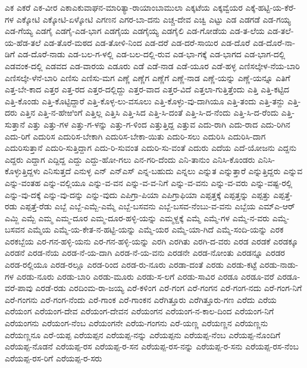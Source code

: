 ಎಕ
ಎಕರೆ
ಎಕ-ವೀರ
ಎಕಾಎಕುವಾಘನ-ಮಾರಿತ್ಯಾ-ರಾಯಾಂಬಾಮುಲಾ
ಎಕ್ಕಟೆಯ
ಎಕ್ಕವ್ವೆಯರ
ಎಕ್ಕೆ-ಹಟ್ಟಿ-ಯ-ಕೆರೆ-ಗಳ
ಎಕ್ಕೋಟಿ
ಎಕ್ಕೋಟಿ-ಏಳ್ಕೋಟಿ
ಎಗಣನ
ಎಗರ-ಬಾ-ದನು
ಎಚ್ಚ-ದೇವ
ಎಚ್ವಿ
ಎಟ್ಟು
ಎಡ
ಎಡಗಡೆ
ಎಡ-ಗಯ್ಯ
ಎಡ-ಗೆಯ್ಯ
ಎಡಗೈ
ಎಡಗೈ-ಎಡ-ಭಾಗ
ಎಡಗೈಯ
ಎಡಗೈಯ್ಯ
ಎಡಗೈಲಿ
ಎಡ-ಗೋಡೆಯ
ಎಡ-ತ-ಲೆಯ
ಎಡ-ತಲೆ-ಯ-ಹೆಡ-ತಲೆ
ಎಡ-ತೊರೆ-ಮಠದ
ಎಡ-ತೋಳಿ-ನಿಂದ
ಎಡ-ದರೆ
ಎಡ-ದರೆ-ಸಾಯಿರ
ಎಡ-ದೊರೆ
ಎಡ-ದೊರೆ-ನಾ-ಡಿಗೆ
ಎಡ-ದೊರೆ-ನಾಡು
ಎಡ-ಬಲ-ಗ-ಳಲ್ಲಿ
ಎಡ-ಬಲ-ದಲ್ಲಿ-ರುವ
ಎಡ-ಭಾ-ಗಕ್ಕೆ
ಎಡ-ಭಾಗದ
ಎಡ-ಭಾಗ-ದಲ್ಲಿ
ಎಡವಂಕ-ದಲ್ಲಿ
ಎಡವದ
ಎಡ-ವಾರಯ
ಎಡೂರು
ಎಡೆ
ಎಡೆ-ನಾಡ
ಎಡೆ-ಯೂರ
ಎಡೆ-ಹಳ್ಳ
ಎಣಿಸಲ್ಕೇಳ-ನೆಯ-ಬಾರಿ
ಎಣಿಸಲ್ಕೇ-ಳೆನೆ-ಬಾರಿ
ಎಣಿಸು
ಎಣಿಸು-ಮಗ
ಎಣ್ಣೆ
ಎಣ್ಣೆಗ
ಎಣ್ಣೆಗೆ
ಎಣ್ಣೆ-ನಾಡ
ಎಣ್ಣೆ-ಯನ್ನು
ಎಣ್ಣೆ-ಯನ್ನೂ
ಎತಿಗೆ
ಎತ್ತ-ಬೇ-ಕಾದ
ಎತ್ತರ
ಎತ್ತ-ರದ
ಎತ್ತರ-ದಲ್ಲಿದ್ದು
ಎತ್ತರ-ವಾದ
ಎತ್ತರ-ವಿದೆ
ಎತ್ತಲಾ-ಗುತ್ತಿತ್ತೆಂದು
ಎತ್ತಿ
ಎತ್ತಿ-ಕಟ್ಟಿದ
ಎತ್ತಿ-ಕೊಂಡು
ಎತ್ತಿ-ಕೊಟ್ಟಿದ್ದಾರೆ
ಎತ್ತಿ-ಕೊಳ್ಳ-ಲು-ವಸೂಲು
ಎತ್ತಿ-ಕೊಳ್ಳು-ವು-ದಾಗಿಯೂ
ಎತ್ತಿ-ತಂದು
ಎತ್ತಿ-ತನ್ದು
ಎತ್ತಿ-ದರು
ಎತ್ತಿನ
ಎತ್ತಿ-ನ-ಹೇಱಿಂಗೆ
ಎತ್ತಿಲ್ಲ
ಎತ್ತಿಸಿ
ಎತ್ತಿ-ಸಿದ
ಎತ್ತಿ-ಸಿ-ದಂತೆ
ಎತ್ತಿ-ಸಿ-ದ-ನೆಂದು
ಎತ್ತಿ-ಸಿ-ದ-ರೆಂದು
ಎತ್ತಿ-ಸುತ್ತಾನೆ
ಎತ್ತು
ಎತ್ತು-ಗಳ
ಎತ್ತು-ಗ-ಳನ್ನು
ಎತ್ತು-ಗ-ಳಿಂದ
ಎತ್ತುತ್ತಿದ್ದ
ಎತ್ತುವ
ಎದು-ರಾಗಿ
ಎದು-ರಾದ
ಎದು-ರಿಗಿನ
ಎದು-ರಿಗೆ
ಎದುರಿಸ
ಎದುರಿಸ-ಬೇಕಾಗಿ
ಎದುರಿಸ-ಬೇಕಾ-ಯಿತು
ಎದುರಿ-ಸಲು
ಎದುರಿಸಿ
ಎದುರಿಸಿ-ದಾಗ
ಎದುರಿಸುತ್ತಾನೆ
ಎದುರಿ-ಸುತ್ತಿದ್ದಾಗ
ಎದು-ರಿ-ಸುವಂತ
ಎದುರಿ-ಸು-ವಂತೆ
ಎದುರು
ಎದೆಯ
ಎದೆ-ಯೋಜನು
ಎದ್ದನು
ಎದ್ದರು
ಎದ್ದಾಗ
ಎದ್ದಿದ್ದ
ಎದ್ದು
ಎದ್ದು-ಹೋ-ಗಲು
ಎನ-ಗರಿ-ದೆಂದು
ಎನಿ-ತಾನುಂ
ಎನಿಸಿ-ಕೊಂಡರು
ಎನಿಸಿ-ಕೊಳ್ಳುತ್ತಿದ್ದಳು
ಎನಿಸುತ್ತದೆ
ಎನುಳ್ಳ
ಎನ್
ಎನ್ಎಸ್
ಎನ್ನ-ಬಹುದು
ಎನ್ನಲು
ಎನ್ನುತ
ಎನ್ನುತ್ತಾರೆ
ಎನ್ನುತ್ತಿದ್ದರು
ಎನ್ನುವ
ಎನ್ನು-ವಂತಹ
ಎನ್ನು-ವಲ್ಲಿಯೂ
ಎನ್ನು-ವ-ವನ
ಎನ್ನು-ವ-ವ-ನಿಗೆ
ಎನ್ನು-ವ-ವನು
ಎನ್ನು-ವ-ವರು
ಎನ್ನು-ವಷ್ಟ-ರಲ್ಲಿ
ಎನ್ನು-ವು-ದಕ್ಕೆ
ಎನ್ನು-ವು-ದನ್ನು
ಎನ್ನು-ವುದು
ಎಪಿಗ್ರಾ-ಪಿಯಾ
ಎಪಿಗ್ರಾಫಿಯಾ
ಎಪ್ಪತ್ತಕ್ಕೆ
ಎಪ್ಪತ್ತನ್ನು
ಎಪ್ಪತ್ತು
ಎಪ್ಪತ್ತೆ-ರಡು
ಎಪ್ಪತ್ತೆ-ರೆಡು
ಎಬ್ಬೆ
ಎಬ್ಬೆ-ಎಮ್ಬೆ-ಎಮ್ಮೆ
ಎಬ್ಬೆ-ಬಸವನು
ಎಬ್ಬೆ-ಬಸವ-ನೆಂಬು-ವ-ವನು
ಎಬ್ಬೆಯ
ಎಮ್ಎ-ಆರ್
ಎಮ್ಜಿ
ಎಮ್ಬೆ
ಎಮ್ಮ
ಎಮ್ಮ-ದೂರ
ಎಮ್ಮ-ದೂರ-ಹಳ್ಳಿ-ಯನ್ನು
ಎಮ್ಮಳ್ದಕ್ಕೆ
ಎಮ್ಮೆ
ಎಮ್ಮೆ-ಗಳ
ಎಮ್ಮೆ-ನ-ವರು
ಎಮ್ಮೆ-ಬಸವನ
ಎಮ್ಮೆಯ
ಎಮ್ಮೆ-ಯ-ಕೇತ-ನ-ಹಟ್ಟಿ-ಯನ್ನು
ಎಮ್ಮೆ-ಯರ
ಎಮ್ಮೆ-ಯಾ-ಗಿದೆ
ಎಮ್ಮೆ-ಸಂದಿ-ಯನ್ನು
ಎರಕ
ಎರಕಬ್ಬೆಯ
ಎರ-ಗನ-ಹಳ್ಳಿ-ಯನು
ಎರ-ಗನ-ಹಳ್ಳಿ-ಯನ್ನು
ಎರಗಿ
ಎರಗಿತು
ಎರಗಿ-ದ-ವರು
ಎರಡ
ಎರಡಕೆ
ಎರಡಕ್ಕೂ
ಎರಡನೆ
ಎರಡ-ನೆಯ
ಎರಡ-ನೆ-ಯ-ದಾಗಿ
ಎರಡ-ನೆ-ಯ-ವನು
ಎರಡನೇ
ಎರಡ-ನೋಂತು
ಎರಡನ್ನೂ
ಎರಡರ
ಎರಡ-ರಲ್ಲಿಯೂ
ಎರಡ-ರಲ್ಲೂ
ಎರಡ-ರಿಂದ
ಎರಡ-ರು-ನೂರು
ಎರಡಾ-ದಂತೆ
ಎರಡು
ಎರಡು-ಕಟ್ಟೆ
ಎರಡು-ನಾಡು-ಗಳ
ಎರಡು-ನೂರು
ಎರಡು-ಬಾರಿ
ಎರಡು-ಮೂರು
ಎರಡು-ಸ-ಲಗೆ
ಎರಡು-ಸಾವಿರ
ಎರಡೂ
ಎರಡೂ-ವರೆ
ಎರಡೂ-ವರೆ-ಪಾವು
ಎರಡೆ-ರಡು
ಎರದಿಂಮ-ರಾ-ಜಯ್ಯ
ಎರೆ-ಕಳಿಂಗ
ಎರೆ-ಗಂಗ
ಎರೆ-ಗಂಗನ
ಎರೆ-ಗಂಗ-ನದು
ಎರೆ-ಗಂಗ-ನಿಗೆ
ಎರೆ-ಗಂಗನು
ಎರೆ-ಗಂಗ-ನೆಂದು
ಎರೆ-ಗಾಂಕ
ಎರೆ-ಗಾಂಕನ
ಎರೆಗಿತ್ತೂರು
ಎರೆಗಿತ್ತೂರು-ಗಣ
ಎರೆದು
ಎರೆಯ
ಎರೆಯಂಗ
ಎರೆಯಂಗ-ದೇವ
ಎರೆಯಂಗ-ದೇವನ
ಎರೆಯಂಗನ
ಎರೆಯಂಗ-ನ-ಕಾಲ-ದಿಂದ
ಎರೆಯಂಗ-ನಿಗೆ
ಎರೆಯಂಗನು
ಎರೆಯಂಗ-ನೆಂಬ
ಎರೆಯಂಗನೇ
ಎರೆಯ-ಗಂಗನು
ಎರೆ-ಯಣ್ಣ
ಎರೆಯಣ್ಣನ
ಎರೆಯಣ್ಣನು
ಎರೆಯಣ್ಣನೂ
ಎರೆ-ಯಪ್ಪ
ಎರೆಯಪ್ಪನ
ಎರೆಯಪ್ಪ-ನನ್ನು
ಎರೆಯಪ್ಪನು
ಎರೆಯಪ್ಪ-ನೆಂಬ
ಎರೆಯಪ್ಪ-ನೊಂದಿಗೆ
ಎರೆಯಪ್ಪ-ನೊಡನೆ
ಎರೆಯಪ್ಪ-ರಸ
ಎರೆಯಪ್ಪ-ರ-ಸನ
ಎರೆಯಪ್ಪ-ರಸ-ನನ್ನು
ಎರೆಯಪ್ಪ-ರ-ಸನು
ಎರೆಯಪ್ಪ-ರಸ-ನೆಂಬ
ಎರೆಯಪ್ಪ-ರಸ-ರಿಗೆ
ಎರೆಯಪ್ಪ-ರ-ಸರು
